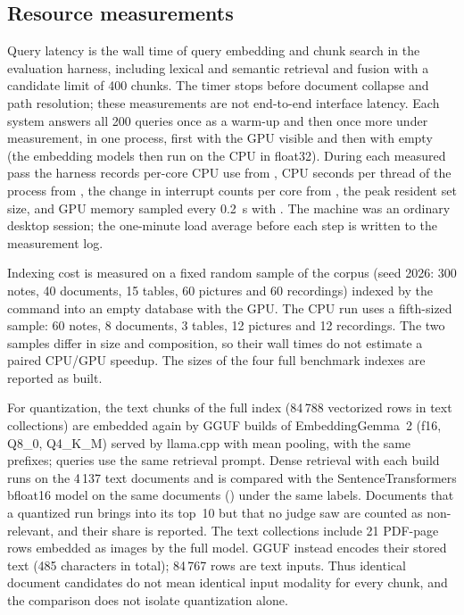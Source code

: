 \subsection{Resource measurements}
Query latency is the wall time of query embedding and chunk search in the evaluation harness, including lexical and semantic retrieval and fusion with a candidate limit of 400 chunks. The timer stops before document collapse and path resolution; these measurements are not end-to-end interface latency. Each system answers all 200 queries once as a warm-up and then once more under measurement, in one process, first with the GPU visible and then with  empty (the embedding models then run on the CPU in float32). During each measured pass the harness records per-core CPU use from , CPU seconds per thread of the process from , the change in interrupt counts per core from , the peak resident set size, and GPU memory sampled every 0.2~s with . The machine was an ordinary desktop session; the one-minute load average before each step is written to the measurement log.

Indexing cost is measured on a fixed random sample of the corpus (seed 2026: 300 notes, 40 documents, 15 tables, 60 pictures and 60 recordings) indexed by the  command into an empty database with the GPU. The CPU run uses a fifth-sized sample: 60 notes, 8 documents, 3 tables, 12 pictures and 12 recordings. The two samples differ in size and composition, so their wall times do not estimate a paired CPU/GPU speedup. The sizes of the four full benchmark indexes are reported as built.

For quantization, the text chunks of the full index (84\,788 vectorized rows in text collections) are embedded again by GGUF builds of EmbeddingGemma~2 (f16, Q8\_0, Q4\_K\_M) served by llama.cpp with mean pooling, with the same  prefixes; queries use the same retrieval prompt. Dense retrieval with each build runs on the 4\,137 text documents and is compared with the SentenceTransformers bfloat16 model on the same documents () under the same labels. Documents that a quantized run brings into its top~10 but that no judge saw are counted as non-relevant, and their share is reported. The text collections include 21 PDF-page rows embedded as images by the full model. GGUF instead encodes their stored text (485 characters in total); 84\,767 rows are text inputs. Thus identical document candidates do not mean identical input modality for every chunk, and the comparison does not isolate quantization alone.

